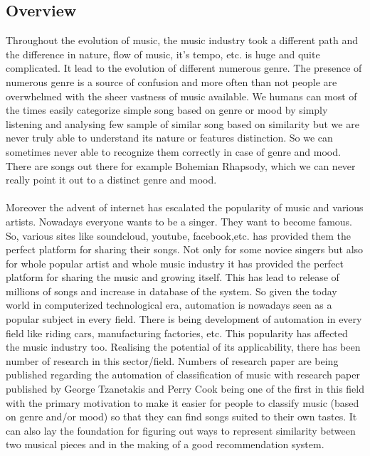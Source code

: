 \subsection{Overview}
Throughout the evolution of music, the music industry took a different path and the difference in nature, flow of music, it's tempo, etc. is 
huge and quite complicated. It lead to the evolution of different numerous genre. The presence of numerous genre is a source of confusion and more often
than not people are overwhelmed with the sheer vastness of music available. We humans can most of the times easily categorize simple song based on genre
or mood by simply listening and analysing few sample of similar song based on similarity but we are never truly able to understand its nature or
features distinction. So we can sometimes never able to recognize them correctly in case of genre and mood. There are songs out there for
example Bohemian Rhapsody, which we can never really point it out to a distinct genre and mood.\\
\\
Moreover the advent of internet has escalated the popularity of music and various artists. Nowadays everyone wants to be a singer. They want to become famous.
So, various sites like soundcloud, youtube, facebook,etc. has provided them the perfect platform for sharing their songs. Not only for some novice
singers but also for whole popular artist and whole music industry it has provided the perfect platform for sharing the music and growing itself.
This has lead to release of millions of songs and increase in database of the system. So given the today world in computerized technological era,
automation is nowadays seen as a popular subject in every field. There is being development of automation in every field like riding cars, manufacturing factories,
etc. This popularity has affected the music industry too. Realising the potential of its applicability, there has been number of research in this sector/field.
Numbers of research paper are being published regarding the automation of classification of music with research paper \cite{Tzanetakis1992} published by George Tzanetakis and Perry Cook
being one of the first in this field with the primary motivation to make it easier for people to classify music (based on genre and/or mood)
so that they can find songs suited to their own tastes. It can also lay the foundation for figuring out ways to represent similarity
between two musical pieces and in the making of a good recommendation system.\\
\\

